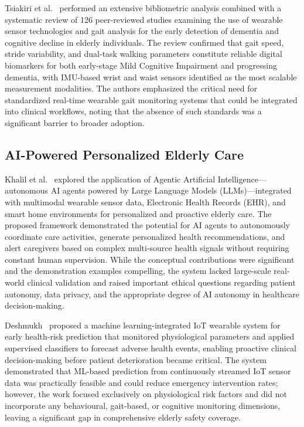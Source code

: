 \documentclass[conference]{IEEEtran}
\begin{document}
Tsiakiri et al.~\cite{tsiakiri2025} performed an extensive bibliometric
analysis combined with a systematic review of 126 peer-reviewed studies
examining the use of wearable sensor technologies and gait analysis
for the early detection of dementia and cognitive decline in elderly
individuals. The review confirmed that gait speed, stride variability,
and dual-task walking parameters constitute reliable digital biomarkers
for both early-stage Mild Cognitive Impairment and progressing dementia,
with IMU-based wrist and waist sensors identified as the most scalable
measurement modalities. The authors emphasized the critical need for
standardized real-time wearable gait monitoring systems that could be
integrated into clinical workflows, noting that the absence of such
standards was a significant barrier to broader adoption.

\subsection{AI-Powered Personalized Elderly Care}

Khalil et al.~\cite{khalil2026} explored the application of Agentic
Artificial Intelligence---autonomous AI agents powered by Large Language
Models (LLMs)---integrated with multimodal wearable sensor data, Electronic
Health Records (EHR), and smart home environments for personalized and
proactive elderly care. The proposed framework demonstrated the potential
for AI agents to autonomously coordinate care activities, generate
personalized health recommendations, and alert caregivers based on complex
multi-source health signals without requiring constant human supervision.
While the conceptual contributions were significant and the demonstration
examples compelling, the system lacked large-scale real-world clinical
validation and raised important ethical questions regarding patient autonomy,
data privacy, and the appropriate degree of AI autonomy in healthcare
decision-making.

Deshmukh~\cite{deshmukh2026} proposed a machine learning-integrated IoT
wearable system for early health-risk prediction that monitored physiological
parameters and applied supervised classifiers to forecast adverse health
events, enabling proactive clinical decision-making before patient
deterioration became critical. The system demonstrated that ML-based
prediction from continuously streamed IoT sensor data was practically
feasible and could reduce emergency intervention rates; however, the work
focused exclusively on physiological risk factors and did not incorporate
any behavioural, gait-based, or cognitive monitoring dimensions, leaving
a significant gap in comprehensive elderly safety coverage.
\end{document}

